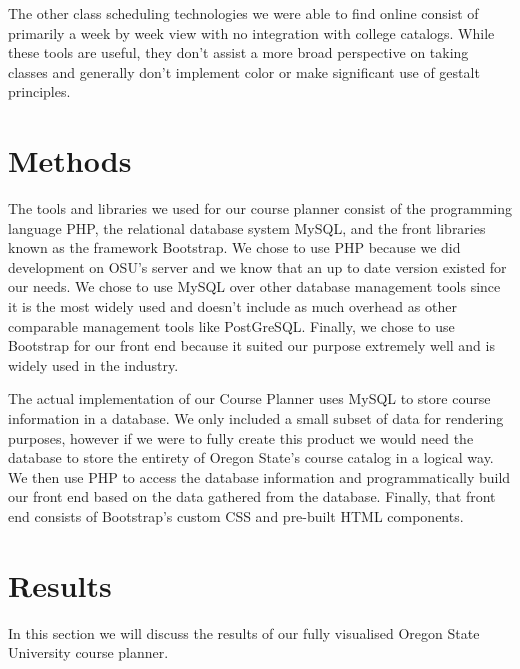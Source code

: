 \documentclass[journal]{vgtc}
\begin{document}
The other class scheduling technologies we were able to find online consist of primarily a week by week view with no integration with college catalogs. While these tools are useful, they don't assist a more broad perspective on taking classes and generally don't implement color or make significant use of gestalt principles.

\section{Methods}
The tools and libraries we used for our course planner consist of the programming language PHP, the relational database system MySQL, and the front libraries known as the framework Bootstrap. We chose to use PHP because we did development on OSU's server and we know that an up to date version existed for our needs. We chose to use MySQL over other database management tools since it is the most widely used and doesn't include as much overhead as other comparable management tools like PostGreSQL. Finally, we chose to use Bootstrap for our front end because it suited our purpose extremely well and is widely used in the industry.

The actual implementation of our Course Planner uses MySQL to store course information in a database. We only included a small subset of data for rendering purposes, however if we were to fully create this product we would need the database to store the entirety of Oregon State's course catalog in a logical way. We then use PHP to access the database information and programmatically build our front end based on the data gathered from the database. Finally, that front end consists of Bootstrap's custom CSS and pre-built HTML components.

\section{Results}
In this section we will discuss the results of our fully visualised Oregon State University course planner. 

\begin{center}
\end{center}
\end{document}
